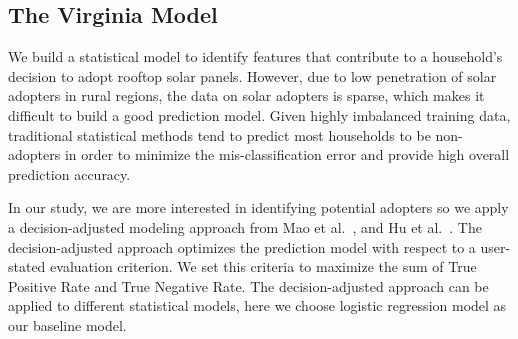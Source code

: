 \subsection{The Virginia Model} \label{virginia_model}
We build a statistical model to identify features that contribute to a household's decision to adopt rooftop solar panels.
However, due to low penetration of solar adopters in rural regions, the data on
solar adopters is sparse, which makes it difficult to build a good
prediction model. Given highly imbalanced training data, traditional statistical methods
tend to predict most households to be non-adopters in order to minimize
the mis-classification error and provide high overall prediction
accuracy.

In our study, we are more interested in identifying potential adopters
so we apply a decision-adjusted modeling approach 
from Mao et al.~\cite{Mao}, and Hu et al.~\cite{hu19rooftop}. The decision-adjusted
approach optimizes the prediction model with respect to a user-stated
evaluation criterion. We set this criteria to maximize the sum of True
Positive Rate and True Negative Rate. The decision-adjusted approach can be applied to
different statistical models, here we choose logistic regression model as
our baseline model.



